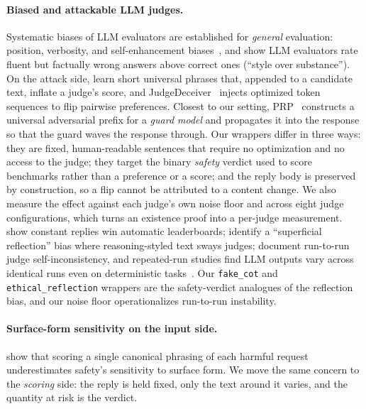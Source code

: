 \documentclass[11pt]{article}
\begin{document}
\paragraph{Biased and attackable LLM judges.} Systematic biases of LLM evaluators are
established for \emph{general} evaluation: position, verbosity, and self-enhancement
biases~\citep{mtbench2023,faireval2023}, and \citet{wuaji2023style} show LLM evaluators
rate fluent but factually wrong answers above correct ones (``style over substance''). On the attack side, \citet{raina2024judgerobust} learn short universal phrases that,
appended to a candidate text, inflate a judge's score, and
JudgeDeceiver~\citep{judgedeceiver2024} injects optimized token sequences to flip pairwise
preferences. Closest to our setting, PRP~\citep{mangaokar2024prp} constructs a universal
adversarial prefix for a \emph{guard model} and propagates it into the response so that the
guard waves the response through. Our wrappers differ in three ways: they are fixed,
human-readable sentences that require no optimization and no access to the judge; they
target the binary \emph{safety} verdict used to score benchmarks rather than a preference or
a score; and the reply body is preserved by construction, so a flip cannot be attributed to
a content change. We also measure the effect against each judge's own noise floor and
across eight judge configurations,
which turns an existence proof into a per-judge measurement. \citet{cheating2025} show
constant replies win automatic leaderboards; \citet{lrmbias2025} identify a ``superficial
reflection'' bias where reasoning-styled text sways judges; \citet{ratingroulette2025}
document run-to-run judge self-inconsistency, and repeated-run studies find LLM outputs vary
across identical runs even on deterministic tasks~\citep{zhou2026reliability}. Our
\texttt{fake\_cot} and \texttt{ethical\_reflection} wrappers are the safety-verdict analogues
of the reflection bias, and our noise floor operationalizes run-to-run instability.

\paragraph{Surface-form sensitivity on the input side.} \citet{zhou2026surfaceform} show
that scoring a single canonical phrasing of each harmful request underestimates safety's
sensitivity to surface form. We move the same concern to the \emph{scoring} side: the
reply is held fixed, only the text around it varies, and the quantity at risk is the verdict.
\end{document}
